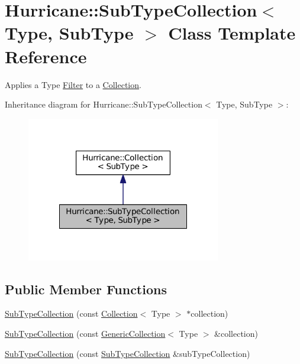\hypertarget{classHurricane_1_1SubTypeCollection}{}\section{Hurricane\+:\+:Sub\+Type\+Collection$<$ Type, Sub\+Type $>$ Class Template Reference}
\label{classHurricane_1_1SubTypeCollection}


Applies a Type \mbox{\hyperlink{classHurricane_1_1Filter}{Filter}} to a \mbox{\hyperlink{classHurricane_1_1Collection}{Collection}}.  




Inheritance diagram for Hurricane\+:\+:Sub\+Type\+Collection$<$ Type, Sub\+Type $>$\+:\nopagebreak
\begin{figure}[H]
\begin{center}
\leavevmode
\includegraphics[width=240pt]{classHurricane_1_1SubTypeCollection__inherit__graph}
\end{center}
\end{figure}
\subsection*{Public Member Functions}
\begin{DoxyCompactItemize}
\item 
\mbox{\hyperlink{classHurricane_1_1SubTypeCollection_a0fd6c8e781097e607b813306fd2ad677}{Sub\+Type\+Collection}} (const \mbox{\hyperlink{classHurricane_1_1Collection}{Collection}}$<$ Type $>$ $\ast$collection)
\item 
\mbox{\hyperlink{classHurricane_1_1SubTypeCollection_a09df045ff335493ac3068a865b793291}{Sub\+Type\+Collection}} (const \mbox{\hyperlink{classHurricane_1_1GenericCollection}{Generic\+Collection}}$<$ Type $>$ \&collection)
\item 
\mbox{\hyperlink{classHurricane_1_1SubTypeCollection_a5c223a20f42ebb72d8d4be5ee99bb2d8}{Sub\+Type\+Collection}} (const \mbox{\hyperlink{classHurricane_1_1SubTypeCollection}{Sub\+Type\+Collection}} \&sub\+Type\+Collection)
\end{DoxyCompactItemize}


